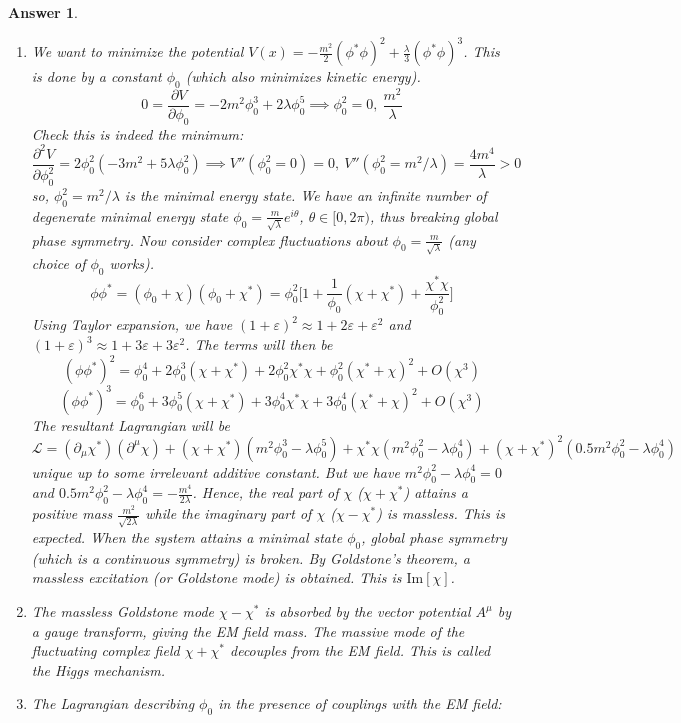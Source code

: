 \documentclass[a4paper]{article}
\newtheorem{ans}{Answer}[section]
\theoremstyle{new}
\begin{document}
\begin{ans}\leavevmode
\begin{enumerate}[label=(\alph*)]
\item We want to minimize the potential $V(x)=-\frac{m^2}{2}(\phi^*\phi)^2+\frac{\lambda}{3}(\phi^*\phi)^3$. This is done by a constant $\phi_0$ (which also minimizes kinetic energy).
$$0=\frac{\partial V}{\partial\phi_0}=-2m^2\phi_0^3+2\lambda\phi_0^5\implies\phi_0^2=0,~\frac{m^2}{\lambda}$$
Check this is indeed the minimum:
$$\frac{\partial^2V}{\partial\phi_0^2}=2\phi_0^2(-3m^2+5\lambda\phi_0^2)\implies V''(\phi_0^2=0)=0,~V''(\phi_0^2=m^2/\lambda)=\frac{4m^4}{\lambda}>0$$
so, $\phi_0^2=m^2/\lambda$ is the minimal energy state. We have an infinite number of degenerate minimal energy state $\phi_0=\frac{m}{\sqrt{\lambda}}e^{i\theta}$, $\theta\in[0,2\pi)$, thus breaking global phase symmetry. Now consider complex fluctuations about $\phi_0=\frac{m}{\sqrt{\lambda}}$ (any choice of $\phi_0$ works).
$$\phi\phi^*=(\phi_0+\chi)(\phi_0+\chi^*)=\phi_0^2\bigg[1+\frac{1}{\phi_0}(\chi+\chi^*)+\frac{\chi^*\chi}{\phi_0^2}\bigg]$$
Using Taylor expansion, we have $(1+\varepsilon)^2\approx 1+2\varepsilon+\varepsilon^2$ and $(1+\varepsilon)^3\approx 1+3\varepsilon+3\varepsilon^2$. The terms will then be
$$(\phi\phi^*)^2=\phi_0^4+2\phi_0^3(\chi+\chi^*)+2\phi_0^2\chi^*\chi+\phi_0^2(\chi^*+\chi)^2+O(\chi^3)$$
$$(\phi\phi^*)^3=\phi_0^6+3\phi_0^5(\chi+\chi^*)+3\phi_0^4\chi^*\chi+3\phi_0^4(\chi^*+\chi)^2+O(\chi^3)$$
The resultant Lagrangian will be
$$\mathcal{L}=(\partial_\mu\chi^*)(\partial^\mu\chi)+(\chi+\chi^*)(m^2\phi_0^3-\lambda\phi_0^5)+\chi^*\chi(m^2\phi_0^2-\lambda\phi_0^4)+(\chi+\chi^*)^2(0.5m^2\phi_0^2-\lambda\phi_0^4)$$
unique up to some irrelevant additive constant. But we have $m^2\phi_0^2-\lambda\phi_0^4=0$ and $0.5m^2\phi_0^2-\lambda\phi_0^4=-\frac{m^4}{2\lambda}$. Hence, the real part of $\chi$ ($\chi+\chi^*$) attains a positive mass $\frac{m^2}{\sqrt{2\lambda}}$ while the imaginary part of $\chi$ ($\chi-\chi^*$) is massless. This is expected. When the system attains a minimal state $\phi_0$, global phase symmetry (which is a continuous symmetry) is broken. By Goldstone's theorem, a massless excitation (or Goldstone mode) is obtained. This is $\text{Im}[\chi]$.
\item The massless Goldstone mode $\chi-\chi^*$ is absorbed by the vector potential $A^\mu$ by a gauge transform, giving the EM field mass. The massive mode of the fluctuating complex field $\chi+\chi^*$ decouples from the EM field. This is called the Higgs mechanism.
\item The Lagrangian describing $\phi_0$ in the presence of couplings with the EM field:

\end{enumerate}
\end{ans}
\end{document}
